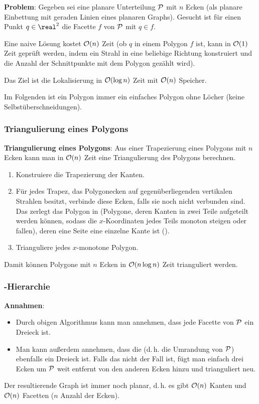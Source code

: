 \textbf{Problem}:
Gegeben sei eine planare Unterteilung $\P$ mit $n$ Ecken
(als planare Einbettung mit geraden Linien eines planaren Graphs).
Gesucht ist für einen Punkt $q \in \real^2$ die Facette $f$ von $\P$ mit $q \in f$.

Eine naive Lösung kostet $\O(n)$ Zeit
(ob $q$ in einem Polygon $f$ ist, kann in $\O(1)$ Zeit geprüft werden, indem ein
Strahl in eine beliebige Richtung konstruiert und die Anzahl der Schnittpunkte mit dem Polygon
gezählt wird).

Das Ziel ist die Lokalisierung in $\O(\log n)$ Zeit mit $\O(n)$ Speicher.

Im Folgenden ist ein Polygon immer ein einfaches Polygon ohne Löcher
(keine Selbstüberschneidungen).

\subsubsection{%
    Triangulierung eines Polygons%
}

\textbf{Triangulierung eines Polygons}:
Aus einer Trapezierung eines Polygons mit $n$ Ecken kann man in $\O(n)$ Zeit
eine Triangulierung des Polygons berechnen.
\begin{enumerate}
    \item
    Konstruiere die Trapezierung der Kanten.

    \item
    Für jedes Trapez, das Polygonecken auf gegenüberliegenden vertikalen Strahlen besitzt,
    verbinde diese Ecken, falls sie noch nicht verbunden sind.
    Das zerlegt das Polygon in 
    (Polygone, deren Kanten in zwei Teile aufgeteilt werden können,
    sodass die $x$-Koordinaten jedes Teils monoton steigen oder fallen),
    deren eine Seite eine einzelne Kante ist
    ().

    \item
    Trianguliere jedes $x$-monotone Polygon.
\end{enumerate}
Damit können Polygone mit $n$ Ecken in $\O(n \log n)$ Zeit trianguliert werden.

\pagebreak

\subsubsection{%
    -Hierarchie%
}

\textbf{Annahmen}:
\begin{itemize}
    \item
    Durch obigen Algorithmus kann man annehmen, dass jede Facette von $\P$ ein Dreieck ist.

    \item
    Man kann außerdem annehmen, dass die  (d.\,h. die Umrandung von $\P$)
    ebenfalls ein Dreieck ist.
    Falls das nicht der Fall ist, fügt man einfach drei Ecken um $\P$ weit entfernt von den
    anderen Ecken hinzu und trianguliert neu.
\end{itemize}
Der resultierende Graph ist immer noch planar, d.\,h. es gibt $\O(n)$ Kanten und $\O(n)$ Facetten
($n$ Anzahl der Ecken).

